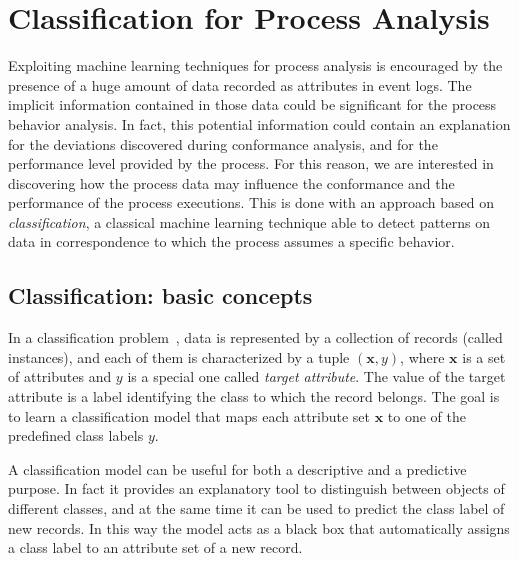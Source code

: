 \documentclass{llncs}
\begin{document}
\section{Classification for Process Analysis}\label{ClassifApproach}
Exploiting machine learning techniques for process analysis is encouraged by the presence of a huge amount of data recorded as attributes in event logs. The implicit information contained in those data could be significant for the process behavior analysis. In fact, this potential information could contain an explanation for the deviations discovered during conformance analysis, and for the performance level provided by the process. For this reason, we are interested in discovering how the process data may influence the conformance and the performance of the process executions. This is done with an approach based on \emph{classification}, a classical machine learning technique able to detect patterns on data in correspondence to which the process assumes a specific behavior.

\subsection{Classification: basic concepts}\label{classifBasicConcept}

In a classification problem~\cite{tan2005introduction}, data is represented by a collection of records (called instances), and each of them is characterized by a tuple $(\mathbf{x},y)$, where $\mathbf{x}$ is a set of attributes and $y$ is a special one called \emph{target attribute}. The value of the target attribute is a label identifying   the class to which the record belongs. The goal is to learn a classification model that maps each attribute set $\mathbf{x}$ to one of the predefined class labels $y$.

A classification model can be useful for both a descriptive and a predictive purpose. In fact it provides an explanatory tool to distinguish between objects of different classes, and at the same time it can be used to predict the class label of new records. In this way the model acts as a black box that automatically assigns a class label to an attribute set of a new record.

\end{document}
